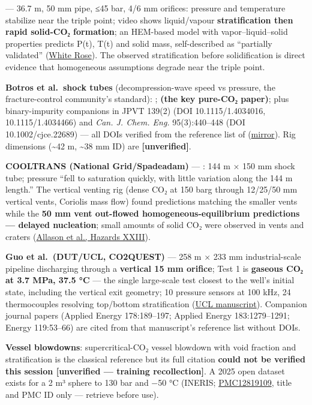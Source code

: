 \textbf{\citet{martynov2018}} --- 36.7 m, 50 mm pipe, ≤45 bar, 4/6 mm
orifices: pressure and temperature stabilize near the triple point;
video shows liquid/vapour \textbf{stratification then rapid solid-CO₂
formation}; an HEM-based model with vapor--liquid--solid properties
predicts P(t), T(t) and solid mass, self-described as ``partially
validated''
(\href{https://eprints.whiterose.ac.uk/id/eprint/130497}{White Rose}).
The observed stratification before solidification is direct evidence
that homogeneous assumptions degrade near the triple point.

\textbf{Botros et al.~shock tubes} (decompression-wave speed vs
pressure, the fracture-control community's standard): \citet{botros2010}; \textbf{\citet{botros2016} (the key pure-CO₂ paper)}; plus
binary-impurity companions in JPVT 139(2) (DOI 10.1115/1.4034016,
10.1115/1.4034466) and \emph{Can. J. Chem. Eng.} 95(3):440--448 (DOI
10.1002/cjce.22689) --- all DOIs verified from the reference list of \citet{munkejord2021}
(\href{https://www.pvv.ntnu.no/~stm/dring/depress-mix-exp.pdf}{mirror}).
Rig dimensions (\textasciitilde42 m, \textasciitilde38 mm ID) are
\textbf{{[}unverified{]}}.

\textbf{COOLTRANS (National Grid/Spadeadam)} --- \citet{cosham2012}: 144 m × 150 mm shock tube; pressure ``fell to saturation quickly, with
little variation along the 144 m length.'' The vertical venting rig
(dense CO₂ at 150 barg through 12/25/50 mm vertical vents, Coriolis mass
flow) found predictions matching the smaller vents while the \textbf{50
mm vent out-flowed homogeneous-equilibrium predictions --- delayed
nucleation}; small amounts of solid CO₂ were observed in vents and
craters
(\href{https://www.icheme.org/media/9161/paper20-hazards-23.pdf}{Allason
et al., Hazards XXIII}).

\textbf{Guo et al.~(DUT/UCL, CO2QUEST)} --- 258 m × 233 mm
industrial-scale pipeline discharging through a \textbf{vertical 15 mm
orifice}; Test 1 is \textbf{gaseous CO₂ at 3.7 MPa, 37.5 °C} --- the
single large-scale test closest to the well's initial state, including
the vertical exit geometry; 10 pressure sensors at 100 kHz, 24
thermocouples resolving top/bottom stratification
(\href{https://discovery-pp.ucl.ac.uk/id/eprint/10051724/1/Manuscript_01.pdf}{UCL
manuscript}). Companion journal papers (Applied Energy 178:189--197;
Applied Energy 183:1279--1291; Energy 119:53--66) are cited from that
manuscript's reference list without DOIs.

\textbf{Vessel blowdowns}: \citet{gebbeken1996} supercritical-CO₂ vessel blowdown with void fraction and stratification is the classical reference but its full citation \textbf{could not be verified this session {[}unverified --- training recollection{]}}. A 2025 open dataset exists for a 2 m³ sphere to
130 bar and −50 °C (INERIS;
\href{https://www.ncbi.nlm.nih.gov/pmc/articles/PMC12819109/}{PMC12819109},
title and PMC ID only --- retrieve before use).

